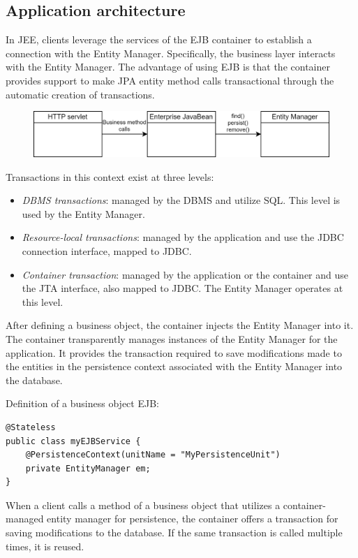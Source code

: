 \subsection{Application architecture}
In JEE, clients leverage the services of the EJB container to establish a connection with the Entity Manager.
Specifically, the business layer interacts with the Entity Manager.
The advantage of using EJB is that the container provides support to make JPA entity method calls transactional through the automatic creation of transactions.
\begin{figure}[H]
    \centering
    \includegraphics[width=0.75\linewidth]{images/jee1.png}
\end{figure}
Transactions in this context exist at three levels:
\begin{itemize}
    \item \textit{DBMS transactions}: managed by the DBMS and utilize SQL. 
        This level is used by the Entity Manager.
    \item \textit{Resource-local transactions}: managed by the application and use the JDBC connection interface, mapped to JDBC.
    \item \textit{Container transaction}: managed by the application or the container and use the JTA interface, also mapped to JDBC. 
        The Entity Manager operates at this level.
\end{itemize}
After defining a business object, the container injects the Entity Manager into it. 
The container transparently manages instances of the Entity Manager for the application. 
It provides the transaction required to save modifications made to the entities in the persistence context associated with the Entity Manager into the database.
\begin{example}
    Definition of a business object EJB: 
\begin{lstlisting}[style=Java]
@Stateless 
public class myEJBService {
    @PersistenceContext(unitName = "MyPersistenceUnit")
    private EntityManager em; 
}
\end{lstlisting}
\end{example}
When a client calls a method of a business object that utilizes a container-managed entity manager for persistence, the container offers a transaction for saving modifications to the database. 
If the same transaction is called multiple times, it is reused. 
